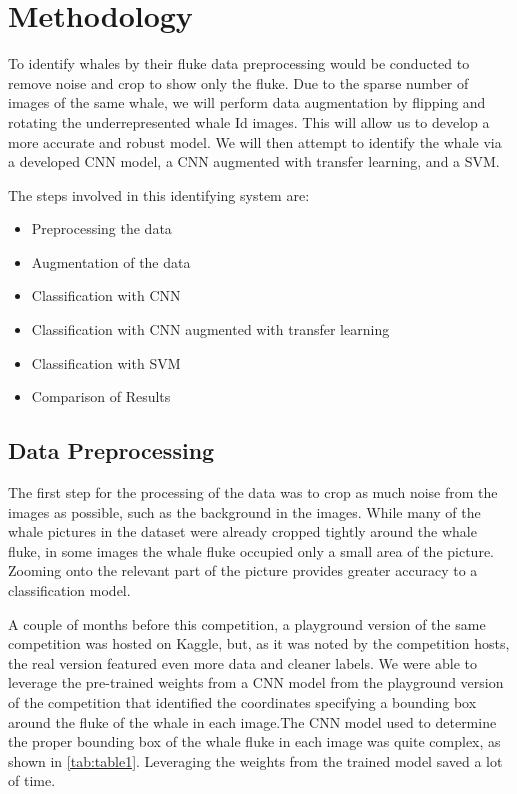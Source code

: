\documentclass[paper=a4, fontsize=11pt]{scrartcl}
\numberwithin{equation}{section}		%
\numberwithin{table}{section}				%
\begin{document}
\section{Methodology}\label{sec: meth}



To identify whales by their fluke data preprocessing would be conducted to remove noise and crop to show only the fluke. Due to the sparse number of images of the same whale, we will perform data augmentation by flipping and rotating the underrepresented whale Id images. This will allow us to develop a more accurate and robust model. We will then attempt to identify the whale via a developed CNN model, a CNN augmented with transfer learning, and a SVM.

The steps involved in this identifying system are:
\begin{itemize}
    \item Preprocessing the data
    \item Augmentation of the data
    \item Classification with CNN
    \item Classification with CNN augmented with transfer learning
    \item Classification with SVM
    \item Comparison of Results
\end{itemize}

\subsection{Data Preprocessing}\label{subsec:Preprocessing}

The first step for the processing of the data was to crop as much noise from the images as possible, such as the background in the images. While many of the whale pictures in the dataset were already cropped tightly around the whale fluke, in some images the whale fluke occupied only a small area of the picture. Zooming onto the relevant part of the picture provides greater accuracy to a classification model. 

A couple of months before this competition, a playground version of the same competition was hosted on Kaggle, but, as it was noted by the competition hosts, the real version featured even more data and cleaner labels. We were able to leverage the pre-trained weights from a CNN model from the playground version of the competition that identified the coordinates specifying a bounding box around the fluke of the whale in each image.The CNN model used to determine the proper bounding box of the whale fluke in each image was quite complex, as shown in \autoref{tab:table1}. Leveraging the weights from the trained model saved a lot of time.
\end{document}
